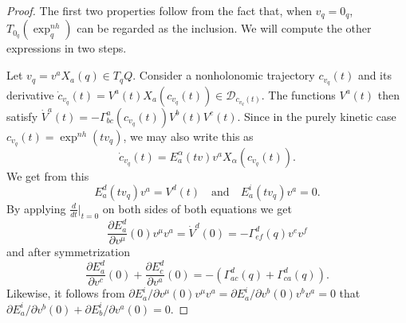 \documentclass[10pt,a4paper]{amsart}
\begin{document}
\begin{proof} The first two properties follow from the fact that, when $v_q=0_q$,   $T_{0_q}(\exp^{nh}_q)$ can be regarded as the inclusion.
We will compute the other expressions in two steps. 

Let $v_q = v^aX_a(q)\in T_qQ$. Consider a nonholonomic trajectory $c_{v_q}(t)$ and its derivative $\dot{c}_{v_q}(t)=V^a(t) X_a\left(c_{v_q}(t)\right) \in \mathcal{D}_{c_{v_q}(t)}$. The functions $V^a(t)$ then satisfy $\dot{V}^a(t)=-\Gamma_{b c}^a\left(c_{v_q}(t)\right) V^b(t) V^c(t)$.
Since in the purely kinetic case {$c_{v_q}(t)=\exp^{nh} \left(t v_q\right)$}, we may also write this as 
\[
\dot{c}_{v_q}(t)=E_a^\alpha(tv) v^a X_\alpha\left(c_{v_q}(t)\right).
\]
We get from this  
$$
E_{a}^d(t v_q) v^a=V^d(t) \quad \text{and} \quad E_a^i(t v_q) v^a=0.
$$
By applying $\frac{d}{dt}|_{t=0}$ on both sides of both equations we get 
$$
\frac{\partial E_a^d}{\partial v^\mu}(0) v^\mu v^a= \dot{V}^d(0)=-\Gamma^d_{ef}(q) v^e v^f
$$ and after symmetrization
$$ \frac{\partial E_a^d}{\partial v^c}(0)+\frac{\partial E_c^d}{\partial v^a}(0) =-(\Gamma_{ac}^d(q)+\Gamma_{ca}^d(q)).
$$
Likewise, it follows from 
$
{\partial E_a^i}/{\partial v^\mu}(0) v^\mu v^a = {\partial E_a^i}/{\partial v^b}(0) v^b v^a=0
$ that 
${\partial E_a^i}/{\partial v^b}(0)+{\partial E_b^i}/{\partial v^a}(0)=0$.



\end{proof}
\end{document}
